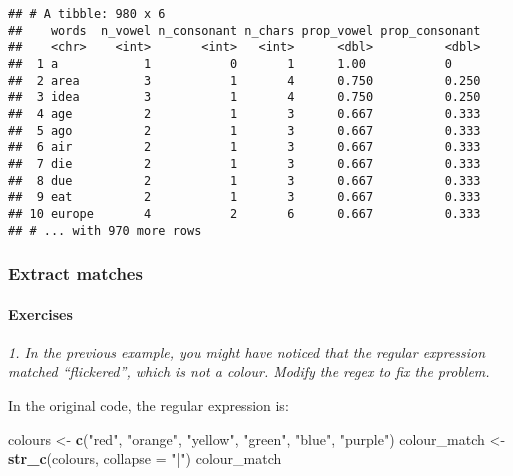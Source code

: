 \documentclass[]{article}
\newenvironment{Shaded}{\begin{snugshade}}{\end{snugshade}}
\newcommand{\KeywordTok}[1]{\textcolor[rgb]{0.13,0.29,0.53}{\textbf{#1}}}
\newcommand{\DataTypeTok}[1]{\textcolor[rgb]{0.13,0.29,0.53}{#1}}
\newcommand{\StringTok}[1]{\textcolor[rgb]{0.31,0.60,0.02}{#1}}
\newcommand{\OperatorTok}[1]{\textcolor[rgb]{0.81,0.36,0.00}{\textbf{#1}}}
\newcommand{\NormalTok}[1]{#1}
\let\oldparagraph\paragraph
\renewcommand{\paragraph}[1]{\oldparagraph{#1}\mbox{}}
\theoremstyle{definition}
\theoremstyle{definition}
\theoremstyle{definition}
\theoremstyle{remark}
\begin{document}
\begin{Shaded}
\end{Shaded}

\begin{verbatim}
## # A tibble: 980 x 6
##    words  n_vowel n_consonant n_chars prop_vowel prop_consonant
##    <chr>    <int>       <int>   <int>      <dbl>          <dbl>
##  1 a            1           0       1      1.00           0    
##  2 area         3           1       4      0.750          0.250
##  3 idea         3           1       4      0.750          0.250
##  4 age          2           1       3      0.667          0.333
##  5 ago          2           1       3      0.667          0.333
##  6 air          2           1       3      0.667          0.333
##  7 die          2           1       3      0.667          0.333
##  8 due          2           1       3      0.667          0.333
##  9 eat          2           1       3      0.667          0.333
## 10 europe       4           2       6      0.667          0.333
## # ... with 970 more rows
\end{verbatim}

\subsubsection{Extract matches}\label{extract-matches}

\paragraph{Exercises}\label{exercises-32}

\emph{1. In the previous example, you might have noticed that the
regular expression matched ``flickered'', which is not a colour. Modify
the regex to fix the problem.}

In the original code, the regular expression is:

\begin{Shaded}
\begin{Highlighting}[]
\NormalTok{colours <-}\StringTok{ }\KeywordTok{c}\NormalTok{(}\StringTok{"red"}\NormalTok{, }\StringTok{"orange"}\NormalTok{, }\StringTok{"yellow"}\NormalTok{, }\StringTok{"green"}\NormalTok{, }\StringTok{"blue"}\NormalTok{, }\StringTok{"purple"}\NormalTok{)}
\NormalTok{colour_match <-}\StringTok{ }\KeywordTok{str_c}\NormalTok{(colours, }\DataTypeTok{collapse =} \StringTok{"|"}\NormalTok{)}
\NormalTok{colour_match}
\end{Highlighting}
\end{Shaded}
\end{document}
